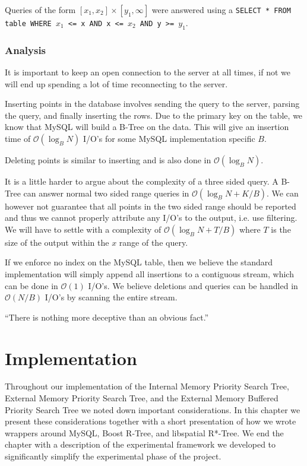 \documentclass[twoside,11pt,openright]{report}
\begin{document}
Queries of the form $\left[x_1,x_2\right] \times \left[y_1,\infty\right]$ were answered using a \texttt{SELECT * FROM table WHERE $x_1$ <= x AND x <= $x_2$ AND y >= $y_1$}.

\subsection{Analysis}
It is important to keep an open connection to the server at all times, if not we will end up spending a lot of time reconnecting to the server.

Inserting points in the database involves sending the query to the server, parsing the query, and finally inserting the rows. Due to the primary key on the table, we know that MySQL will build a B-Tree on the data. This will give an insertion time of $\mathcal{O}(\log_B N)$ I/O's for some MySQL implementation specific $B$.

Deleting points is similar to inserting and is also done in $\mathcal{O}(\log_B N)$.

It is a little harder to argue about the complexity of a three sided query. A B-Tree can answer normal two sided range queries in $\mathcal{O}(\log_B N + K/B)$. We can however not guarantee that all points in the two sided range should be reported and thus we cannot properly attribute any I/O's to the output, i.e. use filtering. We will have to settle with a complexity of $\mathcal{O}(\log_B N + T/B)$ where $T$ is the size of the output within the $x$ range of the query.

If we enforce no index on the MySQL table, then we believe the standard implementation will simply append all insertions to a contiguous stream, which can be done in $\mathcal{O}(1)$ I/O's. We believe deletions and queries can be handled in $\mathcal{O}(N/B)$ I/O's by scanning the entire stream.

\begin{savequote}[0.7\textwidth]
``There is nothing more deceptive than an obvious fact.''
\end{savequote}
\chapter{Implementation}
\label{chp:implementation}

Throughout our implementation of the Internal Memory Priority Search Tree, External Memory Priority Search Tree, and the External Memory Buffered Priority Search Tree we noted down important considerations.
In this chapter we present these considerations together with a short presentation of how we wrote wrappers around MySQL, Boost R-Tree, and libspatial R*-Tree. We end the chapter with a description of the experimental framework we developed to significantly simplify the experimental phase of the project.
\end{document}
